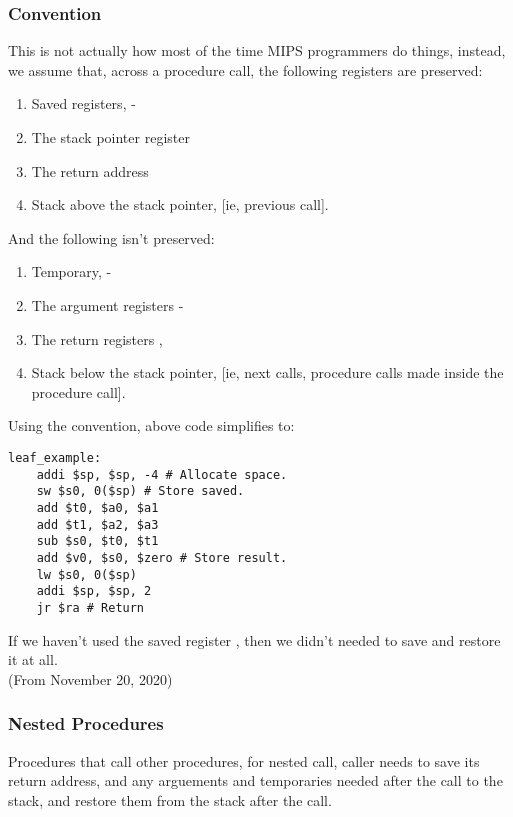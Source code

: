 \documentclass[11pt,a4paper,twocolumn]{book}
\begin{document}
\subsubsection{Convention}

This is not actually how most of the time MIPS programmers do things, instead, we assume that, across a procedure call, the following registers are preserved:

\begin{enumerate}
\item Saved registers, -
\item The stack pointer register \Rsp
\item The return address \Rra
\item Stack above the stack pointer, [ie, previous call].
\end{enumerate}

And the following isn't preserved:

\begin{enumerate}
\item Temporary, -
\item The argument registers -
\item The return registers , 
\item Stack below the stack pointer, [ie, next calls, procedure calls made inside the procedure call].
\end{enumerate}

Using the convention, above code simplifies to:

\begin{lstlisting}
leaf_example:
	addi $sp, $sp, -4 # Allocate space.
	sw $s0, 0($sp) # Store saved.
	add $t0, $a0, $a1
	add $t1, $a2, $a3
	sub $s0, $t0, $t1
	add $v0, $s0, $zero # Store result.
	lw $s0, 0($sp)
	addi $sp, $sp, 2
	jr $ra # Return
\end{lstlisting}

If we haven't used the saved register , then we didn't needed to save and restore it at all.\\

(From November 20, 2020)

\subsubsection{Nested Procedures}

Procedures that call other procedures, for nested call, caller needs to save its return address, and any arguements and temporaries needed after the call to the stack, and restore them from the stack after the call.\\
\end{document}
